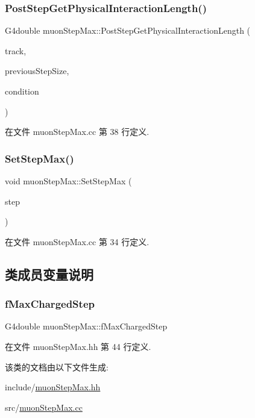 \subsubsection{\texorpdfstring{Post\+Step\+Get\+Physical\+Interaction\+Length()}{PostStepGetPhysicalInteractionLength()}}
{\footnotesize\ttfamily G4double muon\+Step\+Max\+::\+Post\+Step\+Get\+Physical\+Interaction\+Length (\begin{DoxyParamCaption}\item[{const G4\+Track \&}]{track,  }\item[{G4double}]{previous\+Step\+Size,  }\item[{G4\+Force\+Condition $\ast$}]{condition }\end{DoxyParamCaption})\hspace{0.3cm}{\ttfamily [virtual]}}



在文件 muon\+Step\+Max.\+cc 第 38 行定义.

\mbox{\label{classmuonStepMax_a449cd30e5d5284d56a0dc10bf831e4db}} 
\subsubsection{\texorpdfstring{Set\+Step\+Max()}{SetStepMax()}}
{\footnotesize\ttfamily void muon\+Step\+Max\+::\+Set\+Step\+Max (\begin{DoxyParamCaption}\item[{G4double}]{step }\end{DoxyParamCaption})}



在文件 muon\+Step\+Max.\+cc 第 34 行定义.



\subsection{类成员变量说明}
\mbox{\label{classmuonStepMax_a7721e1181fe2ad8741235870bb53dd2a}} 
\subsubsection{\texorpdfstring{f\+Max\+Charged\+Step}{fMaxChargedStep}}
{\footnotesize\ttfamily G4double muon\+Step\+Max\+::f\+Max\+Charged\+Step\hspace{0.3cm}{\ttfamily [private]}}



在文件 muon\+Step\+Max.\+hh 第 44 行定义.



该类的文档由以下文件生成\+:\begin{DoxyCompactItemize}
\item 
include/\hyperlink{muonStepMax_8hh}{muon\+Step\+Max.\+hh}\item 
src/\hyperlink{muonStepMax_8cc}{muon\+Step\+Max.\+cc}\end{DoxyCompactItemize}
